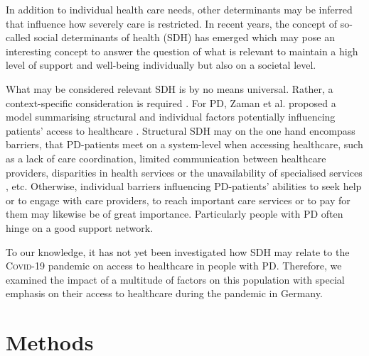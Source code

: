 \documentclass[a4paper,oneside,11pt,english]{scrartcl}
\begin{document}
In addition to individual health care needs, other determinants may be inferred that influence how severely care is restricted. In recent years, the concept of so-called social determinants of health (SDH) has emerged \cite{brown2020effect, world2010conceptual} which may pose an interesting concept to answer the question of what is relevant to maintain a high level of support and well-being individually but also on a societal level.

What may be considered relevant SDH is by no means universal. Rather, a context-specific consideration is required \cite{world2010conceptual}. For \textsc{PD}, Zaman et al. proposed a model summarising structural and individual factors potentially influencing patients' access to healthcare \cite{zaman2021barriers}. Structural SDH may on the one hand encompass barriers, that \textsc{PD}-patients meet on a system-level when accessing healthcare, such as a lack of care coordination, limited communication between healthcare providers, disparities in health services or the unavailability of specialised services \cite{zaman2021barriers}, etc. Otherwise, individual barriers influencing \textsc{PD}-patients' abilities to seek help or to engage with care providers, to reach important care services or to pay for them \cite{zaman2021barriers} may likewise be of great importance. Particularly people with \textsc{PD} often hinge on a good support network. 

To our knowledge, it has not yet been investigated how SDH may relate to the \textsc{Covid}-19 pandemic on access to healthcare in people with \textsc{PD}. Therefore, we examined the impact of a multitude of factors on this population with special emphasis on their access to healthcare during the pandemic in Germany. 

\newpage

\section*{Methods}
\end{document}
